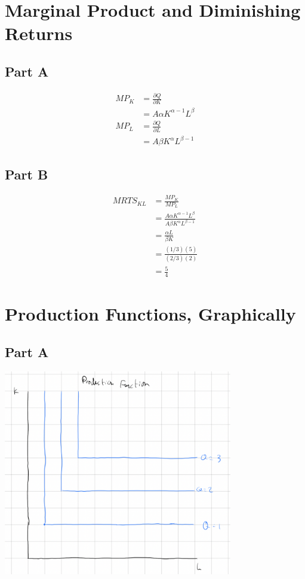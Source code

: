 \documentclass[8pt]{extarticle}
\begin{document}
{\section{Marginal Product and Diminishing Returns}
\subsection*{Part A}
\begin{align*}
	MP_{K} &= \frac{\partial Q}{\partial K} \\
	&= A\alpha K^{\alpha - 1}L^{\beta} \\
	MP_L &= \frac{\partial Q}{\partial L} \\
	&= A\beta K^{\alpha}L^{\beta - 1}
\end{align*}
\subsection*{Part B}
\begin{align*}
	MRTS_{KL} &= \frac{MP_K}{MP_L} \\
	&= \frac{A\alpha K^{\alpha - 1}L^{\beta}}{A\beta K^{\alpha}L^{\beta - 1}} \\
	&= \frac{\alpha L}{\beta K} \\
	&= \frac{(1/3)(5)}{(2/3)(2)} \\
	&= \frac{5}{4}
\end{align*}
\section{Production Functions, Graphically}
\subsection*{Part A}
\begin{center}
	\includegraphics[width=10cm]{HW6Q3A}
\end{center}
}
\end{document}
